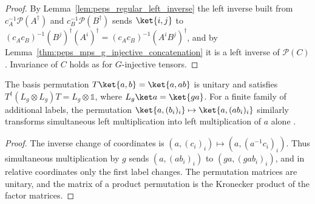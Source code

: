 \begin{proof}\leanok
    By Lemma~\ref{lem:peps_regular_left_inverse} the left inverse built from
    $c_A^{-1}\mathcal{P}(A^\dagger)$ and $c_B^{-1}\mathcal{P}(B^\dagger)$ sends
    $\ket{i,j}$ to $(c_Ac_B)^{-1}(B^j)^\dagger(A^i)^\dagger
        =(c_Ac_B)^{-1}(A^iB^j)^\dagger$, and by
    Lemma~\ref{thm:peps_mps_g_injective_concatenation} it is a left
    inverse of $\mathcal{P}(C)$. Invariance of $C$ holds as for
    $G$-injective tensors.
\end{proof}

\begin{lemma}%
    \label{thm:peps_regular_blocking_coordinates}
    \leanok
    The basis permutation $T\ket{a,b}=\ket{a,ab}$ is unitary and satisfies
    $T^\dagger(L_g\otimes L_g)T=L_g\otimes\mathbb 1$, where
    $L_g\ket a=\ket{ga}$. For a finite family of additional labels, the
    permutation $\ket{a,(b_i)_i}\mapsto\ket{a,(ab_i)_i}$ similarly transforms
    simultaneous left multiplication into left multiplication of $a$
    alone \cite[Section~6, ``Blocking and renormalization'']{Schuch2010PEPS}.
\end{lemma}

\begin{proof}\leanok
    The inverse change of coordinates is $(a,(c_i)_i)\mapsto
        (a,(a^{-1}c_i)_i)$. Thus simultaneous multiplication by $g$ sends
    $(a,(ab_i)_i)$ to $(ga,(gab_i)_i)$, and in relative coordinates only
    the first label changes. The permutation matrices are unitary, and
    the matrix of a product permutation is the Kronecker product of the
    factor matrices.
\end{proof}
